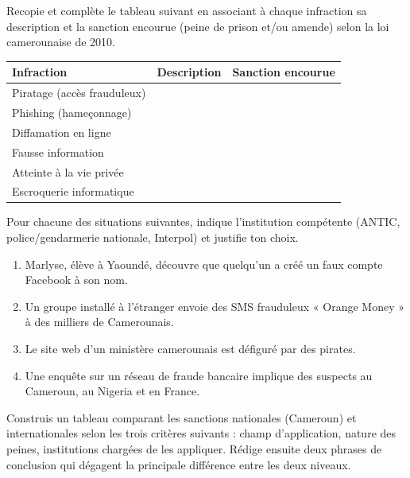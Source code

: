 \documentclass[11pt]{article}
\newcounter{popsec}
\newcounter{popsub}
\newcommand{\courssub}[1]{%
  \stepcounter{popsub}%
  \par\vspace{9pt}\noindent{\popxbold\fontsize{11.5}{13}\selectfont\color{popink}{\color{poporange}\thepopsec.\thepopsub}\hspace{6pt}#1}\par\nopagebreak\vspace{4pt}
}
\begin{document}
\courssub{Je m'entraîne}

\begin{exercice}
Recopie et complète le tableau suivant en associant à chaque infraction sa description et la sanction encourue (peine de prison et/ou amende) selon la loi camerounaise de 2010.

\begin{center}
\begin{tabularx}{\linewidth}{|l|X|X|}
\hline
\rowcolor{popblueL} \textbf{Infraction} & \textbf{Description} & \textbf{Sanction encourue} \\
\hline
Piratage (accès frauduleux) & & \\
\hline
Phishing (hameçonnage) & & \\
\hline
Diffamation en ligne & & \\
\hline
Fausse information & & \\
\hline
Atteinte à la vie privée & & \\
\hline
Escroquerie informatique & & \\
\hline
\end{tabularx}
\end{center}
\end{exercice}

\begin{exercice}
Pour chacune des situations suivantes, indique l'institution compétente (ANTIC, police/gendarmerie nationale, Interpol) et justifie ton choix.

\begin{enumerate}
\item Marlyse, élève à Yaoundé, découvre que quelqu'un a créé un faux compte Facebook à son nom.
\item Un groupe installé à l'étranger envoie des SMS frauduleux « Orange Money » à des milliers de Camerounais.
\item Le site web d'un ministère camerounais est défiguré par des pirates.
\item Une enquête sur un réseau de fraude bancaire implique des suspects au Cameroun, au Nigeria et en France.
\end{enumerate}
\end{exercice}

\begin{exercice}
Construis un tableau comparant les sanctions nationales (Cameroun) et internationales selon les trois critères suivants : champ d'application, nature des peines, institutions chargées de les appliquer. Rédige ensuite deux phrases de conclusion qui dégagent la principale différence entre les deux niveaux.
\end{exercice}
\end{document}
